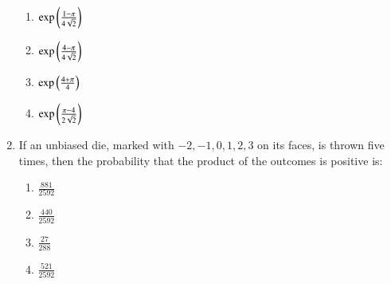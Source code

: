 \documentclass[journal,12pt,twocolumn]{IEEEtran}
\theoremstyle{remark}
\begin{document}
\begin{enumerate}[start=16]
    \begin{enumerate}
        \item $\exp\left(\frac{1-\pi}{4\sqrt{2}}\right)$
        \item $\exp\left(\frac{4-\pi}{4\sqrt{2}}\right)$
        \item $\exp\left(\frac{4+\pi}{4}\right)$
        \item $\exp\left(\frac{\pi-4}{2\sqrt{2}}\right)$
    \end{enumerate}
\item If an unbiased die, marked with $-2, -1, 0, 1, 2, 3$ on its faces, is thrown five times, then the probability that the product of the outcomes is positive is: 
    \begin{enumerate}
        \item $\frac{881}{2592}$
        \item $\frac{440}{2592}$
        \item $\frac{27}{288}$
        \item $\frac{521}{2592}$
    \end{enumerate}

\end{enumerate}
\end{document}
